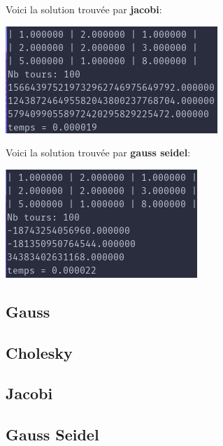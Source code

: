 \documentclass[a4paper]{article}
\begin{document}
Voici la solution trouvée par \textbf{jacobi}:

\includegraphics[scale=0.5]{./img/jacobi/jac_fail.png}

Voici la solution trouvée par \textbf{gauss seidel}:

\includegraphics[scale=0.5]{./img/gauss_seidel/g_e_fail.png}

\clearpage


\begin{appendix}
  \section*{Gauss}
  
\end{appendix}
\clearpage


\begin{appendix}
  \section*{Cholesky}
  
\end{appendix}
\clearpage


\begin{appendix}
  \section*{Jacobi}
  
\end{appendix}
\clearpage


\begin{appendix}
  \section*{Gauss Seidel}
    
\end{appendix}
\end{document}
